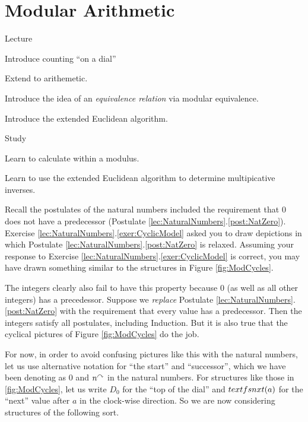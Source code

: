 \chapter{Modular Arithmetic}

\begin{goals}
	\begin{goal}{Lecture}
		\item Introduce counting ``on a dial''
		\item Extend to arithemetic.
		\item Introduce the idea of an \emph{equivalence relation} via modular equivalence.
		\item Introduce the extended Euclidean algorithm.
	\end{goal}
	
	\begin{goal}{Study}
		\item Learn to calculate within a modulus.
		\item Learn to use the extended Euclidean algorithm to determine multipicative inverses.
	\end{goal}
\end{goals}

Recall the postulates of the natural numbers included the requirement that $0$ does not have  a predecessor (Postulate \ref{lec:NaturalNumbers}.\ref{post:NatZero}).  Exercise \ref{lec:NaturalNumbers}.\ref{exer:CyclicModel} asked you to draw depictions in which Postulate \ref{lec:NaturalNumbers}.\ref{post:NatZero} is relaxed. 
Assuming your response to Exercise \ref{lec:NaturalNumbers}.\ref{exer:CyclicModel} is correct, you may have drawn something similar to the structures in Figure \ref{fig:ModCycles}.

The integers clearly also fail to have this property because $0$ (as well as all other integers) has a precedessor. Suppose we \emph{replace} Postulate \ref{lec:NaturalNumbers}.\ref{post:NatZero} with the requirement that every value has a predecessor. Then the integers satisfy all postulates, including Induction. But it is also true that the cyclical pictures of Figure \ref{fig:ModCycles} do the job. 

For now, in order to avoid confusing pictures like this with the natural numbers, let us use alternative notation for ``the start'' and ``successor'', which we have been denoting as $0$ and $n^\curvearrowright$ in the natural numbers.
For structures like those in \ref{fig:ModCycles}, let us write $D_0$ for the ``top of the dial'' and $\mathord{textfs{nxt}}(a)$ for the ``next'' value after $a$ in the clock-wise direction. So we are now considering structures of the following sort.

